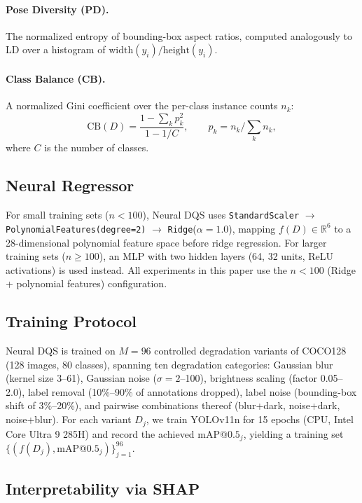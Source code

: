 \documentclass[11pt]{article}
\begin{document}
\paragraph{Pose Diversity (PD).} The normalized entropy of bounding-box
aspect ratios, computed analogously to LD over a histogram of
$\mathrm{width}(y_i)/\mathrm{height}(y_i)$.

\paragraph{Class Balance (CB).} A normalized Gini coefficient over the
per-class instance counts $n_k$:
\begin{equation}
\mathrm{CB}(D) = \frac{1 - \sum_k p_k^2}{1 - 1/C}, \qquad p_k = n_k / \sum_k n_k,
\end{equation}
where $C$ is the number of classes.

\subsection{Neural Regressor}

For small training sets ($n < 100$), Neural DQS uses
\texttt{StandardScaler} $\to$ \texttt{PolynomialFeatures(degree=2)} $\to$
\texttt{Ridge}($\alpha=1.0$), mapping $f(D) \in \mathbb{R}^6$ to a
28-dimensional polynomial feature space before ridge regression. For larger
training sets ($n \geq 100$), an MLP with two hidden layers (64, 32 units,
ReLU activations) is used instead. All experiments in this paper use the
$n<100$ (Ridge + polynomial features) configuration.

\subsection{Training Protocol}

Neural DQS is trained on $M=96$ controlled degradation variants of COCO128
(128 images, 80 classes), spanning ten degradation categories: Gaussian blur
(kernel size 3--61), Gaussian noise ($\sigma=2$--100), brightness scaling
(factor 0.05--2.0), label removal (10\%--90\% of annotations dropped), label
noise (bounding-box shift of 3\%--20\%), and pairwise combinations thereof
(blur+dark, noise+dark, noise+blur). For each variant $D_j$, we train
YOLOv11n for 15 epochs (CPU, Intel Core Ultra 9 285H) and record the achieved
$\mathrm{mAP@0.5}_j$, yielding a training set
$\{(f(D_j), \mathrm{mAP@0.5}_j)\}_{j=1}^{96}$.

\subsection{Interpretability via SHAP}
\end{document}
